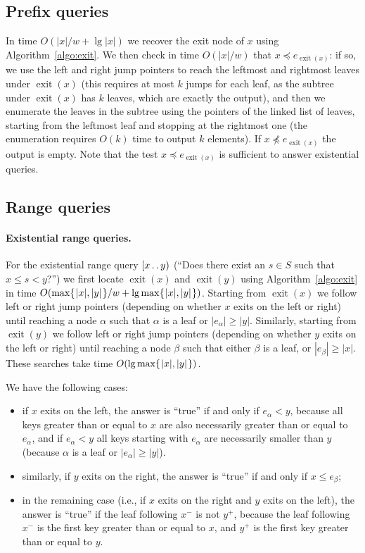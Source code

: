\documentclass[a4paper]{article}
\newcommand{\exit}[1]{\operatorname{exit}(#1)}
\newcommand{\?}{\mskip1.5mu}
\def\..{\,\mathpunct{\ldotp\ldotp}} %
\begin{document}
\subsection{Prefix queries}  

In time $O(|x|/w + \lg|x|)$ we recover the
exit node of $x$ using Algorithm~\ref{algo:exit}. We then check in time
$O(|x|/w)$ that $x\preceq e_{\exit x}$: if so, we use the left and right jump pointers to
reach the leftmost and rightmost leaves under $\exit x$ (this requires at most $k$ jumps for each leaf, 
as the subtree under $\exit x$ has $k$ leaves, which are exactly the output), and then we
enumerate the leaves in the subtree using the pointers of the linked list of leaves, starting from the
leftmost leaf and stopping at the rightmost one (the enumeration requires
$O(k)$ time to output $k$ elements). If $x\not\preceq e_{\exit x}$ the output is
empty. Note that the test $x\preceq e_{\exit x}$ is sufficient to answer
existential queries. 

\subsection{Range queries} 

\paragraph{Existential range queries.}
For the existential range query $[x\..y)$ (``Does there exist an $s \in S$ such that $x \leq s<y$?'') we first locate $\exit
x$ and $\exit y$ using Algorithm~\ref{algo:exit} in time
$O(\max\{\?|x|,|y|\?\}/w + \lg\max\{\?|x|,|y|\?\})$. Starting from $\exit x$
we follow left or right jump pointers (depending on whether $x$ exits on the left or right) until
reaching a node $\alpha$ such that $\alpha$  is 
a leaf or $|e_\alpha|\geq|y|$.
Similarly, starting from $\exit y$ we follow left or right jump pointers (depending on whether $y$ exits on the left or right) until
reaching a node $\beta$ such that either $\beta$ is 
a leaf, or $|e_\beta|\geq|x|$. These searches take time $O(\lg\max\{\?|x|,|y|\?\})$.

We have the following cases:
\begin{itemize}
  \item if $x$ exits on the left, the answer is ``true'' if and only if $e_\alpha<y$, because all keys
  greater than or equal to $x$ are also necessarily greater than or equal to $e_\alpha$, 
  and if $e_\alpha<y$ all keys starting with $e_\alpha$ are necessarily smaller than $y$ (because $\alpha$ is a leaf or $|e_\alpha|\geq |y|$).
  \item similarly, if $y$ exits on the right, the answer is ``true'' if and only if $x \leq e_\beta$;
  \item in the remaining case (i.e., if $x$ exits on the right and $y$ exits on the left), the answer is ``true'' if the leaf
  following $x^-$ is not $y^+$, because the leaf following $x^-$ is the first key greater than or equal to $x$, and $y^+$ is the 
first key greater than or equal to $y$.
\end{itemize}
\end{document}
